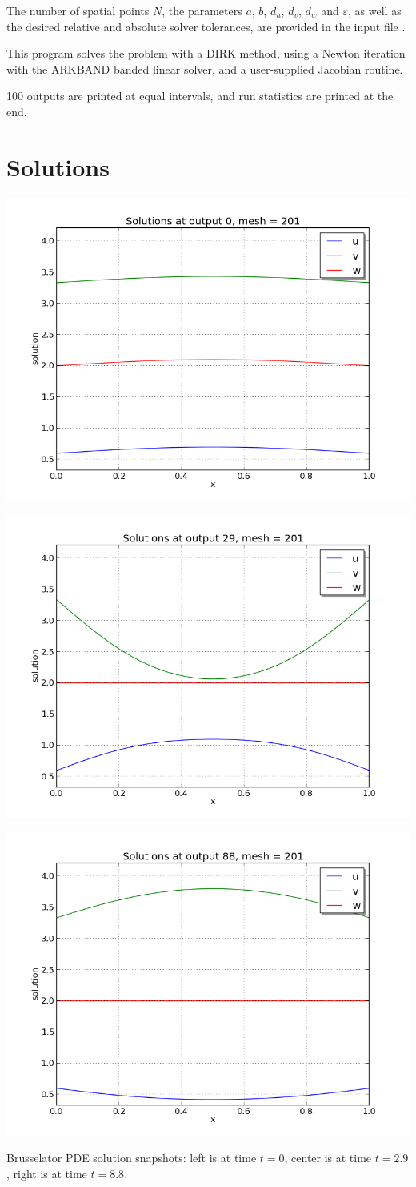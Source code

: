 \documentclass[letterpaper,10pt,english]{sphinxmanual}
\begin{document}
The number of spatial points $N$, the parameters $a$,
$b$, $d_u$, $d_v$, $d_w$ and
$\varepsilon$, as well as the desired relative and absolute
solver tolerances, are provided in the input file .

This program solves the problem with a DIRK method, using a Newton
iteration with the ARKBAND banded linear solver, and a user-supplied
Jacobian routine.

100 outputs are printed at equal intervals, and run statistics
are printed at the end.


\section{Solutions}
\label{ark_brusselator1D:solutions}
\includegraphics[width=0.300\linewidth]{plot-ark_brusselator1D_1.png}

\includegraphics[width=0.300\linewidth]{plot-ark_brusselator1D_2.png}

\includegraphics[width=0.300\linewidth]{plot-ark_brusselator1D_3.png}

Brusselator PDE solution snapshots: left is at time $t=0$,
center is at time $t=2.9$, right is at time $t=8.8$.
\end{document}
